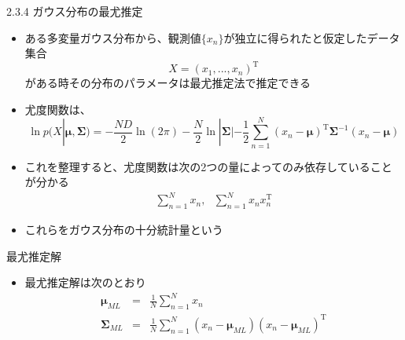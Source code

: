 \begin{frame}{2.3.4 ガウス分布の最尤推定}
 \begin{itemize}
  \item  ある多変量ガウス分布から、観測値$\{x_n\}$が独立に得られたと仮定したデータ集合
         \begin{equation}
          X=(x_1,...,x_n)^{\mathrm{T}}
         \end{equation}
         がある時その分布のパラメータは最尤推定法で推定できる
  \item 尤度関数は、
        \begin{equation}
         \ln  p(X|\bm{\mu}, \bm{\Sigma}) = -\frac{ND}{2}\ln (2\pi)-\frac{N}{2}\ln |\bm{\Sigma}|-\frac{1}{2}\sum_{n=1}^{N}(x_n-\bm{\mu})^{\mathrm{T}}\bm{\Sigma}^{-1}(x_n-\bm{\mu})
        \end{equation}
  \item これを整理すると、尤度関数は次の2つの量によってのみ依存していることが分かる
        \begin{eqnarray}
         \sum_{n=1}^{N}x_n, \ \ \  \sum_{n=1}^{N}x_nx_n^{\mathrm{T}}
        \end{eqnarray}
  \item これらをガウス分布の\alert{十分統計量}という
 \end{itemize}
\end{frame}

\begin{frame}{最尤推定解}
 \begin{itemize}
  \item 最尤推定解は次のとおり
        \begin{eqnarray}
         \bm{\mu}_{ML} &=& \frac{1}{N}\sum_{n=1}^{N}x_n\\
         \bm{\Sigma}_{ML}&=&\frac{1}{N}\sum_{n=1}^{N}(x_n-\bm{\mu}_{ML})(x_n-\bm{\mu}_{ML})^{\mathrm{T}}
        \end{eqnarray}
 \end{itemize}
\end{frame}


